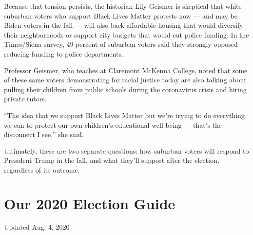 Because that tension persists, the historian Lily Geismer is skeptical
that white suburban voters who support Black Lives Matter protests now
--- and may be Biden voters in the fall --- will also back affordable
housing that would diversify their neighborhoods or support city budgets
that would cut police funding. In the Times/Siena survey, 49 percent of
suburban voters said they strongly opposed reducing funding to police
departments.

Professor Geismer, who teaches at Claremont McKenna College, noted that
some of these same voters demonstrating for racial justice today are
also talking about pulling their children from public schools during the
coronavirus crisis and hiring private tutors.

``The idea that we support Black Lives Matter but we're trying to do
everything we can to protect our own children's educational well-being
--- that's the disconnect I see,'' she said.

Ultimately, these are two separate questions: how suburban voters will
respond to President Trump in the fall, and what they'll support after
the election, regardless of its outcome.

\hypertarget{our-2020-election-guide}{%
\section{Our 2020 Election Guide}\label{our-2020-election-guide}}

Updated Aug. 4, 2020

